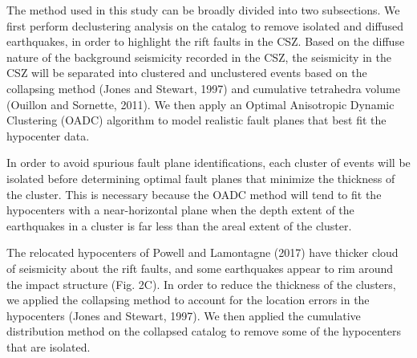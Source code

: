 \documentclass[draft]{agujournal2018}
\begin{document}
The method used in this study can be broadly divided into two subsections. We first perform declustering analysis on the catalog to remove isolated and diffused earthquakes, in order to highlight the rift faults in the CSZ. Based on the diffuse nature of the background seismicity recorded in the CSZ, the seismicity in the CSZ will be separated into clustered and unclustered events based on the collapsing method (Jones and Stewart, 1997) and cumulative tetrahedra volume (Ouillon and Sornette, 2011). We then apply an Optimal Anisotropic Dynamic Clustering (OADC) algorithm to model realistic fault planes that best fit the hypocenter data. 

In order to avoid spurious fault plane identifications, each cluster of events will be isolated before determining optimal fault planes that minimize the thickness of the cluster. This is necessary because the OADC method will tend to fit the hypocenters with a near-horizontal plane when the depth extent of the earthquakes in a cluster is far less than the areal extent of the cluster. 







The relocated hypocenters of Powell and Lamontagne (2017) have thicker cloud of seismicity about the rift faults, and some earthquakes appear to rim around the impact structure (Fig. 2C). In order to reduce the thickness of the clusters, we applied the collapsing method to account for the location errors in the hypocenters (Jones and Stewart, 1997). 
We then applied the cumulative distribution method on the collapsed catalog to remove some of the hypocenters that are isolated. 
\end{document}
